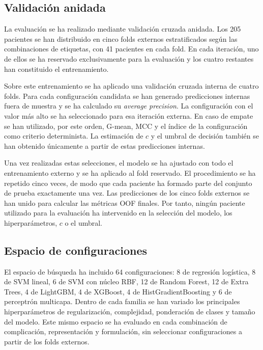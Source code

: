 \subsection{Validación anidada}

La evaluación se ha realizado mediante validación cruzada anidada. Los 205 pacientes se han distribuido en cinco folds externos estratificados según las combinaciones de etiquetas, con 41 pacientes en cada fold. En cada iteración, uno de ellos se ha reservado exclusivamente para la evaluación y los cuatro restantes han constituido el entrenamiento.

Sobre este entrenamiento se ha aplicado una validación cruzada interna de cuatro folds. Para cada configuración candidata se han generado predicciones internas fuera de muestra y se ha calculado su \textit{average precision}. La configuración con el valor más alto se ha seleccionado para esa iteración externa. En caso de empate se han utilizado, por este orden, G-mean, MCC y el índice de la configuración como criterio determinista. La estimación de \(c\) y el umbral de decisión también se han obtenido únicamente a partir de estas predicciones internas.

Una vez realizadas estas selecciones, el modelo se ha ajustado con todo el entrenamiento externo y se ha aplicado al fold reservado. El procedimiento se ha repetido cinco veces, de modo que cada paciente ha formado parte del conjunto de prueba exactamente una vez. Las predicciones de los cinco folds externos se han unido para calcular las métricas OOF finales. Por tanto, ningún paciente utilizado para la evaluación ha intervenido en la selección del modelo, los hiperparámetros, \(c\) o el umbral.

\subsection{Espacio de configuraciones}

El espacio de búsqueda ha incluido 64 configuraciones: 8 de regresión logística, 8 de SVM lineal, 6 de SVM con núcleo RBF, 12 de Random Forest, 12 de Extra Trees, 4 de LightGBM, 4 de XGBoost, 4 de HistGradientBoosting y 6 de perceptrón multicapa. Dentro de cada familia se han variado los principales hiperparámetros de regularización, complejidad, ponderación de clases y tamaño del modelo. Este mismo espacio se ha evaluado en cada combinación de complicación, representación y formulación, sin seleccionar configuraciones a partir de los folds externos.

